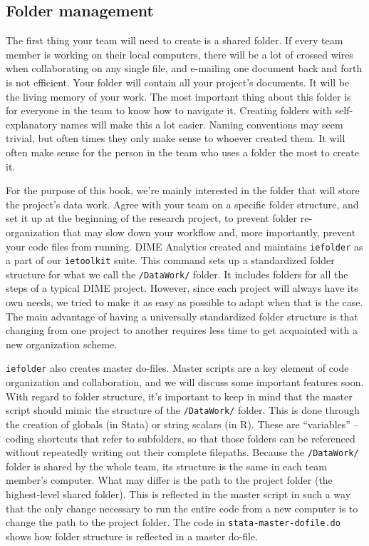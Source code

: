 \subsection{Folder management}

The first thing your team will need to create is a shared folder.
If every team member is working on their local computers,
there will be a lot of crossed wires when collaborating on any single file,
and e-mailing one document back and forth is not efficient.
Your folder will contain all your project's documents.
It will be the living memory of your work.
The most important thing about this folder is for everyone in the team to know how to navigate it.
Creating folders with self-explanatory names will make this a lot easier.
Naming conventions may seem trivial,
but often times they only make sense to whoever created them.
It will often make sense for the person in the team who uses a folder the most to create it.

For the purpose of this book,
we're mainly interested in the folder that will store the project's data work.
Agree with your team on a specific folder structure, and
set it up at the beginning of the research project,
to prevent folder re-organization that may slow down your workflow and,
more importantly, prevent your code files from running.
DIME Analytics created and maintains
\texttt{iefolder}
as a part of our \texttt{ietoolkit} suite.
This command sets up a standardized folder structure for what we call the \texttt{/DataWork/} folder.
It includes folders for all the steps of a typical DIME project.
However, since each project will always have its own needs,
we tried to make it as easy as possible to adapt when that is the case.
The main advantage of having a universally standardized folder structure
is that changing from one project to another requires less
time to get acquainted with a new organization scheme.

\texttt{iefolder} also creates master do-files.
Master scripts are a key element of code organization and collaboration,
and we will discuss some important features soon.
With regard to folder structure, it's important to keep in mind
that the master script should mimic the structure of the \texttt{/DataWork/} folder.
This is done through the creation of globals (in Stata) or string scalars (in R).
These are ``variables'' -- coding shortcuts that refer to subfolders,
so that those folders can be referenced without repeatedly writing out their complete filepaths.
Because the \texttt{/DataWork/} folder is shared by the whole team,
its structure is the same in each team member's computer.
What may differ is the path to the project folder (the highest-level shared folder).
This is reflected in the master script in such a way that
the only change necessary to run the entire code from a new computer
is to change the path to the project folder.
The code in \texttt{stata-master-dofile.do} shows how folder structure is reflected in a master do-file.


